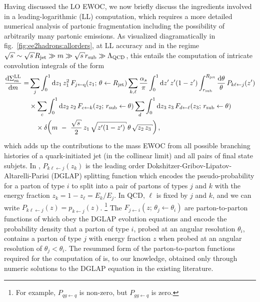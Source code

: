 Having discussed the LO EWOC, we now briefly discuss the ingredients involved in a leading-logarithmic (LL) computation, which requires a more detailed numerical analysis of partonic fragmentation including the possibility of arbitrarily many partonic emissions.
%
As visualized diagramatically in fig.~\ref{fig:ee2hadrons:allorders}, at LL accuracy and in the regime $\sqrt{s} \sim \sqrt{s} \Rjet \gg m \gg \sqrt{s} \rsub \gg \Lambda_{\rm QCD}$, this entails the computation of intricate convolution integrals of the form
\begin{align}
    \label{eq:allorder_ewoc_convolution}
    \frac{\dd \Sigma^\text{LL}_m}{\dd m}
    =&
    \sum_j
    \int_0^1 \dd z_1\,
    z_1^2\, F_{j \leftarrow \text{q}}
    (z_1;\,\theta\leftarrow \Rjet)
    \sum_{k,\ell}
    \frac{\alpha_s}{\pi}
    \int_0^1 \dd z'\,
    z^{\prime}(1-z^\prime)
    \int_{\rsub}^{\Rjet}
    \frac{\dd \theta}{\theta}
    \,
    P_{k \ell \leftarrow j}(z')
    \notag \\ & \times
    \sum_c
    \int_0^1 \dd z_2\, z_2\,
    F_{c \leftarrow k}
    (z_2;\,\rsub \leftarrow \theta)
    \sum_d
    \int_0^1 \dd z_3\, z_3\,
    F_{d \leftarrow \ell}
    (z_3;\,\rsub \leftarrow \theta)
    \notag \\ & \quad \times
    \delta\biggl(
        m
        \,\,
        -
        \,\,
        \frac{\sqrt{s}}{2}
        \,
        z_1
        \,
        \sqrt{
        z^\prime
        (1-z^\prime)
        }
        \,
        \theta
        \,
        \sqrt{z_2 \, z_3}
    \biggr)
    \,
    ,
\end{align}
which adds up the contributions to the mass EWOC from all possible branching histories of a quark-initiated jet (in the collinear limit) and all pairs of final state subjets.
%
In , \(P_{k \ell \leftarrow j}(z_k)\) is the leading order Dokshitzer-Gribov-Lipatov-Altarelli-Parisi (DGLAP) splitting function \cite{Gribov:1972ri,Dokshitzer:1977sg,Altarelli:1977zs} which encodes the pseudo-probability for a parton of type \(i\) to split into a pair of partons of types \(j\) and \(k\) with the energy fraction \(z_k = 1 - z_\ell = E_k / E_j\).
%
In QCD, \(\ell\) is fixed by \(j\) and \(k\), and we can write \(P_{k \ell \leftarrow j}(z) = p_{k \leftarrow j}(z)\).%
\footnote{
    For example, \(P_{qg\leftarrow q}\) is non-zero, but \(P_{gg \leftarrow q}\) is zero.
}
%
The \(F_{j \leftarrow i}(z;\,\theta_j \leftarrow \theta_i)\) are \gls{parton-to-parton} functions of  which obey the DGLAP evolution equations and encode the probability density that a parton of type \(i\), probed at an angular resolution \(\theta_i\), contains a parton of type \(j\) with energy fraction \(z\) when probed at an angular resolution of \(\theta_j < \theta_i\).
%
The resummed form of the \gls{parton-to-parton} functions required for the computation of  is, to our knowledge, obtained only through numeric solutions to the DGLAP equation in the existing literature.

